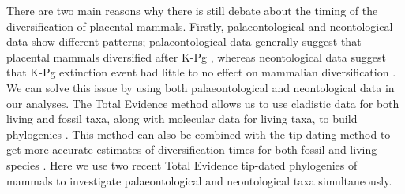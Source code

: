 There are two main reasons why there is still debate about the timing of the diversification of placental mammals. 
Firstly, palaeontological and neontological data show different patterns; palaeontological data generally suggest that placental mammals diversified after K-Pg \citep[e.g.][]{O'Leary08022013}, whereas neontological data suggest that K-Pg extinction event had little to no effect on mammalian diversification \citep{bininda-emondsthe2007,meredithimpacts2011,Stadler12042011}.
We can solve this issue by using both palaeontological and neontological data in our analyses. 
The Total Evidence method allows us to use cladistic data for both living and fossil taxa, along with molecular data for living taxa, to build phylogenies \citep{ronquista2012}. %
This method can also be combined with the tip-dating method \citep{ronquista2012,Wood01032013} to get more accurate estimates of diversification times for both fossil and living species \citep[but see][]{Arcila2015131}.
Here we use two recent Total Evidence tip-dated phylogenies of mammals \citep{Slater2012MEE,beckancient2014} to investigate palaeontological and neontological taxa simultaneously.

